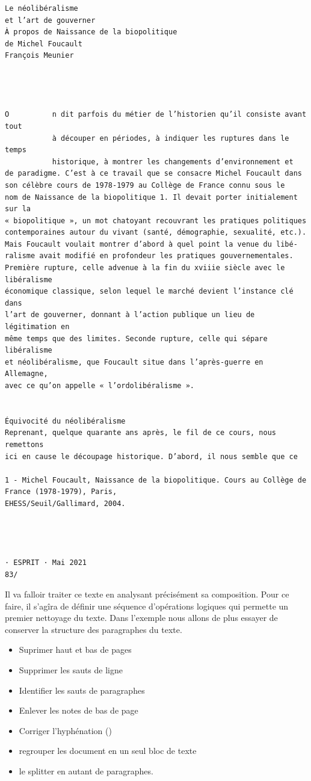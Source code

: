 \documentclass[
  letterpaper,
  DIV=11,
  numbers=noendperiod]{scrreprt}
\providecommand{\tightlist}{%
  \setlength{\itemsep}{0pt}\setlength{\parskip}{0pt}}\usepackage{longtable,booktabs,array}
\begin{document}
\begin{verbatim}
Le néolibéralisme
et l’art de gouverner
À propos de Naissance de la biopolitique
de Michel Foucault
François Meunier




O          n dit parfois du métier de l’historien qu’il consiste avant tout
           à découper en périodes, à indiquer les ruptures dans le temps
           historique, à montrer les changements d’environnement et
de paradigme. C’est à ce travail que se consacre Michel Foucault dans
son célèbre cours de 1978‑1979 au Collège de France connu sous le
nom de Naissance de la biopolitique 1. Il devait porter initialement sur la
« biopolitique », un mot chatoyant recouvrant les pratiques politiques
contemporaines autour du vivant (santé, démographie, sexualité, etc.).
Mais Foucault voulait montrer d’abord à quel point la venue du libé‑
ralisme avait modifié en profondeur les pratiques gouvernementales.
Première rupture, celle advenue à la fin du xviiie siècle avec le libéralisme
économique classique, selon lequel le marché devient l’instance clé dans
l’art de gouverner, donnant à l’action publique un lieu de légitimation en
même temps que des limites. Seconde rupture, celle qui sépare libéralisme
et néolibéralisme, que Foucault situe dans l’après‑guerre en Allemagne,
avec ce qu’on appelle « l’ordolibéralisme ».


Équivocité du néolibéralisme
Reprenant, quelque quarante ans après, le fil de ce cours, nous remettons
ici en cause le découpage historique. D’abord, il nous semble que ce

1 - Michel Foucault, Naissance de la biopolitique. Cours au Collège de France (1978-1979), Paris,
EHESS/Seuil/Gallimard, 2004.




· ESPRIT · Mai 2021                                                                                 83/
\end{verbatim}

Il va falloir traiter ce texte en analysant précisément sa composition.
Pour ce faire, il s'agîra de définir une séquence d'opérations logiques
qui permette un premier nettoyage du texte. Dans l'exemple nous allons
de plus essayer de conserver la structure des paragraphes du texte.

\begin{itemize}
\tightlist
\item
  Suprimer haut et bas de pages
\item
  Supprimer les sauts de ligne
\item
  Identifier les sauts de paragraphes
\item
  Enlever les notes de bas de page
\item
  Corriger l'hyphénation ()
\item
  regrouper les document en un seul bloc de texte
\item
  le splitter en autant de paragraphes.
\end{itemize}
\end{document}
